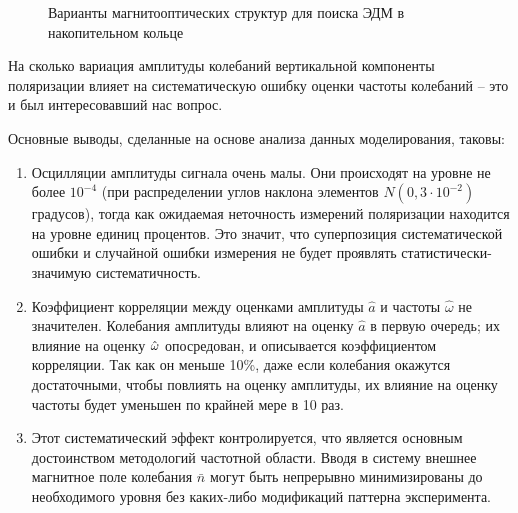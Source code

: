 \begin{figure}[H]
	\begin{minipage}{.5\linewidth}{
	}
	\end{minipage}%
	\begin{minipage}{.5\linewidth}\captionsetup{width=.85\linewidth}
	\caption{Варианты магнитооптических структур для поиска ЭДМ в накопительном кольце}
	\end{minipage}
\end{figure}

На сколько вариация амплитуды колебаний вертикальной
компоненты поляризации влияет на систематическую ошибку оценки частоты колебаний -- это
и был интересовавший нас вопрос.

Основные выводы, сделанные на основе анализа данных моделирования, таковы:
\begin{enumerate}
	\item Осцилляции амплитуды сигнала очень малы. Они происходят на уровне не более $10^{-4}$ (при
	распределении углов наклона элементов ${N(0, 3\cdot 10^{-2})}$ градусов), 
	тогда как ожидаемая неточность измерений поляризации находится 	на уровне единиц процентов. 
	Это значит, что суперпозиция систематической ошибки и случайной ошибки измерения
	не будет проявлять статистически-значимую систематичность.
	\item Коэффициент корреляции между оценками амплитуды $\hat a$ и частоты $\hat\omega$ не значителен. Колебания амплитуды
	влияют на оценку $\hat a$ в первую очередь; их влияние на оценку $\hat{\omega}$ опосредован, и описывается
	коэффициентом корреляции. Так как он меньше 10\%, даже если колебания окажутся достаточными, 
	чтобы повлиять на оценку амплитуды, их влияние на оценку частоты будет уменьшен по крайней мере в 10 раз.
	\item Этот систематический эффект контролируется, что является основным достоинством методологий
	частотной области. Вводя в систему внешнее магнитное поле	колебания $\bar n$ могут быть 
	непрерывно минимизированы  до необходимого уровня без каких-либо модификаций паттерна эксперимента.
\end{enumerate}


